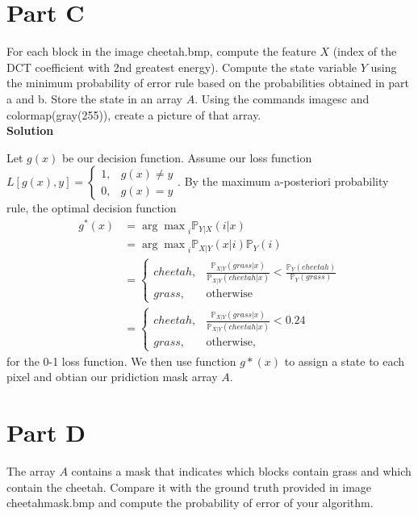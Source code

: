 \documentclass{article}
\newcommand*{\prob}{\mathds{P}}
\begin{document}
\pagebreak

\section*{Part C}

For each block in the image {\selectfont cheetah.bmp}, compute the feature $X$ (index of the DCT coefficient with
2nd greatest energy). Compute the state variable $Y$ using the minimum probability of error rule based
on the probabilities obtained in part a and b. Store the state in an array $A$. Using the commands {\selectfont imagesc} 
and {\selectfont colormap(gray(255))}, create a picture of that array. \\

\textbf{\large Solution}

Let $g(x)$ be our decision function. Assume our loss function 
$L[g(x), y] = \begin{cases}
  1, &g(x) \neq y \\
  0, &g(x) = y
\end{cases}$. 
By the maximum a-posteriori probability rule, the optimal decision function
\begin{align*}
  g^*(x) 
  &= {\arg \max}_{i} \prob_{Y|X}(i | x) \\
  &= {\arg \max}_{i} \prob_{X|Y}(x | i)\prob_Y(i) \\
  &= \begin{cases}
    cheetah, &\frac{\prob_{X|Y}(grass | x)}{\prob_{X|Y}(cheetah | x)} < \frac{\prob_Y(cheetah)}{\prob_Y(grass)} \\
    grass, &\text{otherwise}
  \end{cases} \\
  &= \begin{cases}
    cheetah, &\frac{\prob_{X|Y}(grass | x)}{\prob_{X|Y}(cheetah | x)} < 0.24 \\
    grass, &\text{otherwise},
  \end{cases}
\end{align*}
for the 0-1 loss function. We then use function $g*(x)$ to assign a state to each pixel and obtian 
our pridiction mask array $A$.

\section*{Part D}

The array $A$ contains a mask that indicates which blocks contain grass and which contain the
cheetah. Compare it with the ground truth provided in image {\selectfont cheetah\textunderscore mask.bmp} and compute the probability of error of your algorithm. \\
\end{document}
